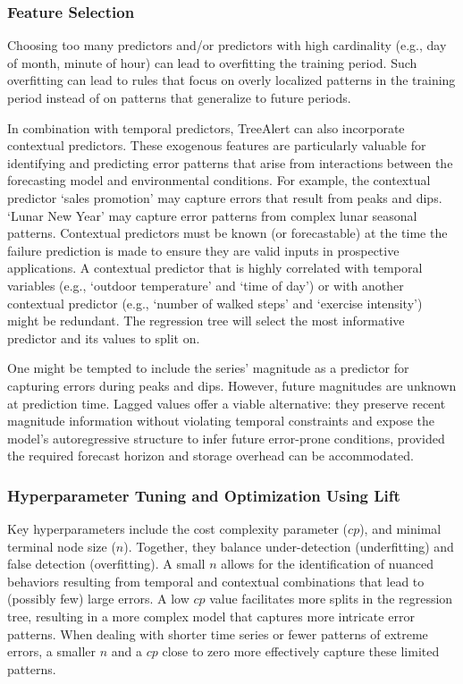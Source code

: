\documentclass[12pt]{article}
\begin{document}
\subsubsection{Feature Selection}
Choosing too many predictors and/or predictors with high cardinality (e.g., day of month, minute of hour) can lead to overfitting the training period. Such overfitting can lead to rules that focus on overly localized patterns in the training period instead of on patterns that generalize to future periods. 

In combination with temporal predictors, TreeAlert can also incorporate contextual predictors. These exogenous features are particularly valuable for identifying and predicting error patterns that arise from interactions between the forecasting model and environmental conditions. For example, the contextual predictor ‘sales promotion’ may capture errors that result from peaks and dips. `Lunar New Year' may capture error patterns from complex lunar seasonal patterns. Contextual predictors must be known (or forecastable) at the time the failure prediction is made to ensure they are valid inputs in prospective applications. A contextual predictor that is highly correlated with temporal variables (e.g., `outdoor temperature' and `time of day') or with another contextual predictor (e.g., `number of walked steps' and `exercise intensity') might be redundant. The regression tree will select the most informative predictor and its values to split on.

One might be tempted to include the series' magnitude %
as a predictor for capturing errors during peaks and dips. However, future magnitudes are unknown at prediction time. Lagged values offer a viable alternative: they preserve recent magnitude information without violating temporal constraints and expose the model's autoregressive structure to infer future error-prone conditions, provided the required forecast horizon and storage overhead can be accommodated.

\subsubsection{Hyperparameter Tuning and Optimization Using Lift}
\label{sec:tuning_optimization}

Key hyperparameters include the cost complexity parameter ($cp$), and minimal terminal node size ($n$). Together, they balance under-detection (underfitting) and false detection (overfitting). A small $n$ allows for the identification of nuanced behaviors resulting from temporal and contextual combinations that lead to (possibly few) large errors. A low $cp$ value facilitates more splits in the regression tree, resulting in a more complex model that captures more intricate error patterns. When dealing with shorter time series or fewer patterns of extreme errors, a smaller $n$ and a $cp$ close to zero  more effectively capture these limited patterns.
\end{document}
